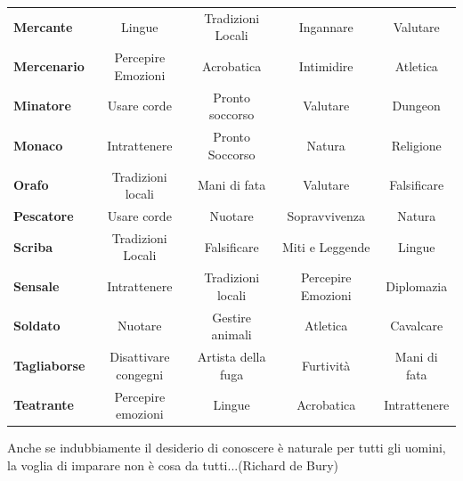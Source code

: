 \begin{tabularx}{\textwidth}{|>{\raggedright\arraybackslash}l|c|c|c|c|}
\textbf{Mercante}& Lingue&Tradizioni Locali&Ingannare&Valutare\\
\textbf{Mercenario} & Percepire Emozioni & Acrobatica & Intimidire & Atletica\\
\textbf{Minatore}& Usare corde&Pronto soccorso&Valutare&Dungeon\\
\textbf{Monaco} & Intrattenere &Pronto Soccorso & Natura & Religione\\
\textbf{Orafo} & Tradizioni locali & Mani di fata & Valutare & Falsificare\\
\textbf{Pescatore}& Usare corde&Nuotare&Sopravvivenza&Natura\\
\textbf{Scriba} &Tradizioni Locali& Falsificare & Miti e Leggende & Lingue\\
\textbf{Sensale} & Intrattenere & Tradizioni locali & Percepire Emozioni & Diplomazia\\
\textbf{Soldato}& Nuotare&Gestire animali&Atletica&Cavalcare\\
\textbf{Tagliaborse} & Disattivare congegni&Artista della fuga&Furtività&Mani di fata\\
\textbf{Teatrante}& Percepire emozioni& Lingue&Acrobatica&Intrattenere\\
\end{tabularx}

\vfill

\begin{changemargin}{0.3cm}{0.3cm}\begin{enfasi}{
Anche se indubbiamente il desiderio di conoscere è naturale per tutti gli uomini, la voglia di imparare non è cosa da tutti...(Richard de Bury)
}\end{enfasi}\end{changemargin}

